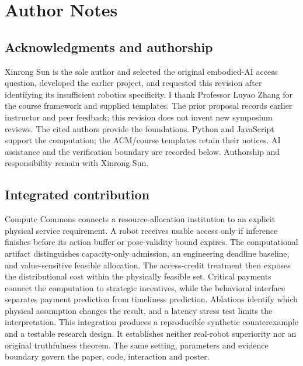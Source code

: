 \section*{Author Notes}
\subsection*{Acknowledgments and authorship}
Xinrong Sun is the sole author and selected the original embodied-AI access question, developed the earlier project, and requested this revision after identifying its insufficient robotics specificity. I thank Professor Luyao Zhang for the course framework and supplied templates. The prior proposal records earlier instructor and peer feedback; this revision does not invent new symposium reviews. The cited authors provide the foundations. Python and JavaScript support the computation; the ACM/course templates retain their notices. AI assistance and the verification boundary are recorded below. Authorship and responsibility remain with Xinrong Sun.

\subsection*{Integrated contribution}
Compute Commons connects a resource-allocation institution to an explicit physical service requirement. A robot receives usable access only if inference finishes before its action buffer or pose-validity bound expires. The computational artifact distinguishes capacity-only admission, an engineering deadline baseline, and value-sensitive feasible allocation. The access-credit treatment then exposes the distributional cost within the physically feasible set. Critical payments connect the computation to strategic incentives, while the behavioral interface separates payment prediction from timeliness prediction. Ablations identify which physical assumption changes the result, and a latency stress test limits the interpretation. This integration produces a reproducible synthetic counterexample and a testable research design. It establishes neither real-robot superiority nor an original truthfulness theorem. The same setting, parameters and evidence boundary govern the paper, code, interaction and poster.

